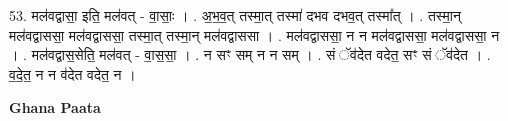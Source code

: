 \documentclass[17pt]{extarticle}
\begin{document}
53. मल॑वद्वासा॒ इति॒ मल॑वत् - वा॒साः॒ । . अ॒भ॒व॒त् तस्मा॒त् तस्मा॑ दभव दभव॒त् तस्मा᳚त् । . तस्मा॒न् मल॑वद्वाससा॒ मल॑वद्वाससा॒ तस्मा॒त् तस्मा॒न् मल॑वद्वाससा । . मल॑वद्वाससा॒ न न मल॑वद्वाससा॒ मल॑वद्वाससा॒ न । . मल॑वद्वास॒सेति॒ मल॑वत् - वा॒स॒सा॒ । . न सꣳ सम् न न सम् । . सं ॅव॑देत वदेत॒ सꣳ सं ॅव॑देत । . व॒दे॒त॒ न न व॑देत वदेत॒ न । \newline

\textbf{Ghana Paata } \newline
\end{document}
